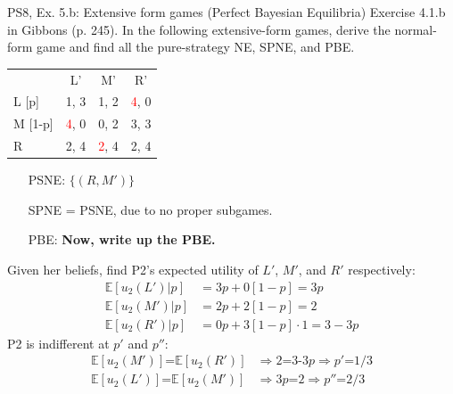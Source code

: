 \begin{frame}{PS8, Ex. 5.b: Extensive form games (Perfect Bayesian Equilibria)}
    Exercise 4.1.b in Gibbons (p. 245). In the following extensive-form games, derive the normal-form game and find all the pure-strategy NE, SPNE, and PBE.
    \vspace{-10pt}
    \begin{multicols}{2}
      \begin{table}
        \begin{tabular}{l|c|c|c|}
          \multicolumn{1}{c}{} & \multicolumn{1}{c}{L'} & \multicolumn{1}{c}{M'} & \multicolumn{1}{c}{R'} \\\cline{2-4}
          L [p]   & 1, \color{blue}3 & 1, 2 & \textcolor{red}{4}, 0 \\\cline{2-4}
          M [1-p] & \textcolor{red}{4}, 0 & 0, 2 & 3, \color{blue}3 \\\cline{2-4}
          R       & 2, \color{blue}4 & \textcolor{red}{2}, \color{blue}4 & 2, \color{blue}4 \\\cline{2-4}
        \end{tabular}
      \end{table} \vspace{-8pt}
      \begin{itemize}
        \item[PSNE:] $\{(R,M')\}$
        \item[SPNE =] PSNE, due to no proper subgames.
        \item[PBE:] \textbf{Now, write up the PBE.}
      \end{itemize} \vspace{-6pt}
      Given her beliefs, find P2's expected utility of $L'$, $M'$, and $R'$ respectively: \vspace{-6pt}
      \begin{align*}
        \mathbb{E}[u_2(L')|p]&=3p+0[1-p]=3p\\ \mathbb{E}[u_2(M')|p]&=2p+2[1-p]=2\\
        \mathbb{E}[u_2(R')|p]&=0p+3[1-p]\cdot1=3-3p
      \end{align*}
      P2 is indifferent at $p'$ and $p''$: \vspace{-6pt}
      \begin{align*}
        \mathbb{E}[u_2(M')]\text{=}\mathbb{E}[u_2(R')]&\Rightarrow 2\text{=3-3}p\Rightarrow p'\text{=}1/3\\
        \mathbb{E}[u_2(L')]\text{=}\mathbb{E}[u_2(M')]&\Rightarrow 3p\text{=}2\Rightarrow p''\text{=}2/3
      \end{align*} \vspace{-22pt}

\end{multicols}
\end{frame}
